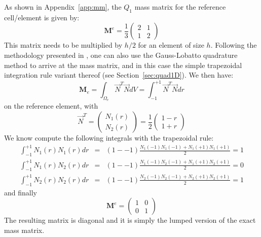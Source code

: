 As shown in Appendix~\ref{app:mm}, the $Q_1$ mass matrix for the reference cell/element is given by:
\[
{\bm M}^e=
\frac{1}{3}
\left(
\begin{array}{cc}
2 & 1 \\ 1 & 2
\end{array}
\right)
\]
This matrix needs to be multiplied by $h/2$ for an element of size $h$.
Following the methodology presented in \cite{zhgh93}, one can also use the Gauss-Lobatto 
quadrature method to arrive at the mass matrix, and in this case the simple trapezoidal 
integration rule variant thereof (see Section~\ref{sec:quad1D}).
We then have:
\begin{equation}
{\bm M}_e=\int_{\Omega_e} \vec{N}^T \vec{N} dV
= \int_{-1}^{+1} \vec{N}^T \vec{N} dr
\end{equation}
on the reference element, with 
\[
{\vec N}^T = 
\left(
\begin{array}{c}
N_1(r) \\ N_2(r)
\end{array}
\right)
=
\frac{1}{2}
\left(
\begin{array}{c}
1-r \\ 1+r
\end{array}
\right)
\]
We know compute the following integrals with the trapezoidal rule:
\begin{eqnarray}
\int_{-1}^{+1} N_1(r) N_1(r) dr &=& (1--1) \frac{N_1(-1) N_1(-1)  + N_1(+1) N_1(+1) }{2} = 1 \\
\int_{-1}^{+1} N_1(r) N_2(r) dr &=& (1--1) \frac{N_1(-1) N_2(-1)  + N_1(+1) N_2(+1) }{2} = 0 \\
\int_{-1}^{+1} N_2(r) N_2(r) dr &=& (1--1) \frac{N_2(-1) N_2(-1)  + N_2(+1) N_2(+1) }{2} = 1 
\end{eqnarray}
and finally 
\[
{\bm M}^e=
\left(
\begin{array}{cc}
1 & 0 \\ 0 & 1
\end{array}
\right)
\]
The resulting matrix is diagonal and it is simply the lumped version of the exact mass matrix. 





